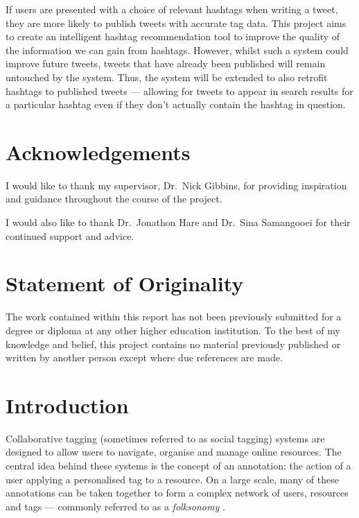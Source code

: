 \documentclass[12pt,a4paper]{article}
\begin{document}
If users are presented with a choice of relevant hashtags when writing a tweet, they are more likely to publish tweets with accurate tag data. This project aims to create an intelligent hashtag recommendation tool to improve the quality of the information we can gain from hashtags. However, whilst such a system could improve future tweets, tweets that have already been published will remain untouched by the system. Thus, the system will be extended to also retrofit hashtags to published tweets --- allowing for tweets to appear in search results for a particular hashtag even if they don't actually contain the hashtag in question.
\pagebreak

\tableofcontents

\pagebreak

\section*{Acknowledgements}
I would like to thank my supervisor, Dr.\ Nick Gibbins, for providing inspiration and guidance throughout the course of the project.

I would also like to thank Dr.\ Jonathon Hare and Dr.\ Sina Samangooei for their continued support and advice.

\section*{Statement of Originality}

The work contained within this report has not been previously submitted for a degree or diploma at any other higher education institution. To the best of my knowledge and belief, this project contains no material previously published or written by another person except where due references are made.

\pagebreak

\section{Introduction}
Collaborative tagging (sometimes referred to as social tagging) systems are designed to allow users to navigate, organise and manage online resources. The central idea behind these systems is the concept of an annotation: the action of a user applying a personalised tag to a resource. On a large scale, many of these annotations can be taken together to form a complex network of users, resources and tags --- commonly referred to as a \emph{folksonomy} \parencite{Xu:2008}.
\end{document}

